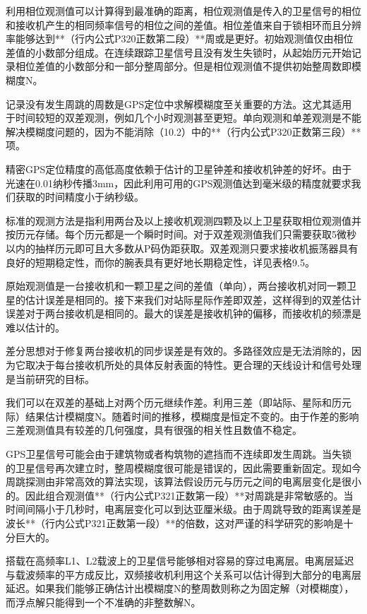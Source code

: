利用相位观测值可以计算得到最准确的距离，相位观测值是传入的卫星信号的相位和接收机产生的相同频率信号的相位之间的差值。相位差值来自于锁相环而且分辨率能够达到**（行内公式P320正数第二段）**周或是更好。初始观测值仅由相位差值的小数部分组成。在连续跟踪卫星信号且没有发生失锁时，从起始历元开始记录相位差值的小数部分和一部分整周部分。但是相位观测值不提供初始整周数即模糊度N。

记录没有发生周跳的周数是GPS定位中求解模糊度至关重要的方法。这尤其适用于时间较短的双差观测，例如几个小时观测甚至更短。单向观测和单差观测是不能解决模糊度问题的，因为不能消除（10.2）中的**（行内公式P320正数第三段）**项。

精密GPS定位精度的高低高度依赖于估计的卫星钟差和接收机钟差的好坏。由于光速在0.01纳秒传播3mm，因此利用可用的GPS观测值达到毫米级的精度就要求我们获取的时间精度小于纳秒级。

标准的观测方法是指利用两台及以上接收机观测四颗及以上卫星获取相位观测值并按历元存储。每个历元都是一个瞬时时间。对于双差观测值我们只需要获取5微秒以内的抽样历元即可且大多数从P码伪距获取。双差观测只要求接收机振荡器具有良好的短期稳定性，而你的腕表具有更好地长期稳定性，详见表格9.5。

原始观测值是一台接收机和一颗卫星之间的差值（单向），两台接收机对同一颗卫星的估计误差是相同的。接下来我们对站际星际作差即双差，这样得到的双差估计误差对于两台接收机是相同的。最大的误差是接收机钟的偏移，而接收机的频漂是难以估计的。

差分思想对于修复两台接收机的同步误差是有效的。多路径效应是无法消除的，因为它取决于每台接收机所处的具体反射表面的特性。更合理的天线设计和信号处理是当前研究的目标。

我们可以在双差的基础上对两个历元继续作差。利用三差（即站际、星际和历元际）结果估计模糊度N。随着时间的推移，模糊度是恒定不变的。由于作差的影响三差观测值具有较差的几何强度，具有很强的相关性且数值不稳定。	

GPS卫星信号可能会由于建筑物或者构筑物的遮挡而不连续即发生周跳。当失锁的卫星信号再次建立时，整周模糊度很可能是错误的，因此需要重新固定。现如今周跳探测由非常高效的算法实现，该算法假设历元与历元之间的电离层变化是很小的。因此组合观测值**（行内公式P321正数第一段）**对周跳是非常敏感的。当时间间隔小于几秒时，电离层变化可以到达亚厘米级。由于周跳导致的距离误差是波长**（行内公式P321正数第一段）**的倍数，这对严谨的科学研究的影响是十分巨大的。

搭载在高频率L1、L2载波上的卫星信号能够相对容易的穿过电离层。电离层延迟与载波频率的平方成反比，双频接收机利用这个关系可以估计得到大部分的电离层延迟。如果我们能够正确估计出模糊度N的整周数则称之为固定解（对模糊度），而浮点解只能得到一个不准确的非整数解N。

